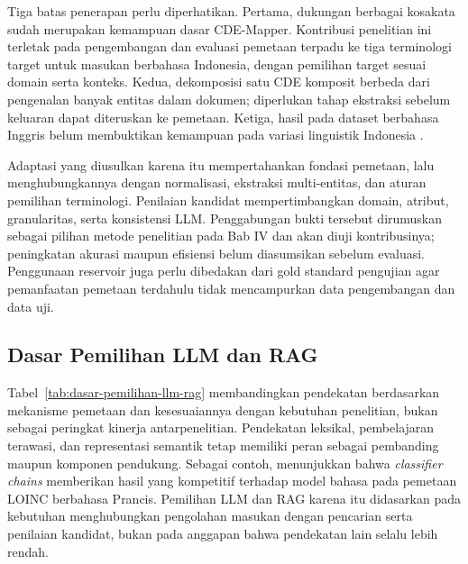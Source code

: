 Tiga batas penerapan perlu diperhatikan. Pertama, dukungan berbagai kosakata sudah merupakan kemampuan dasar CDE-Mapper. Kontribusi penelitian ini terletak pada pengembangan dan evaluasi pemetaan terpadu ke tiga terminologi target untuk masukan berbahasa Indonesia, dengan pemilihan target sesuai domain serta konteks. Kedua, dekomposisi satu CDE komposit berbeda dari pengenalan banyak entitas dalam dokumen; diperlukan tahap ekstraksi sebelum keluaran dapat diteruskan ke pemetaan. Ketiga, hasil pada dataset berbahasa Inggris belum membuktikan kemampuan pada variasi linguistik Indonesia \citep{gilani_cde-mapper_2025,purwitasari_comparison_2023}.

Adaptasi yang diusulkan karena itu mempertahankan fondasi pemetaan, lalu menghubungkannya dengan normalisasi, ekstraksi multi-entitas, dan aturan pemilihan terminologi. Penilaian kandidat mempertimbangkan domain, atribut, granularitas, serta konsistensi LLM. Penggabungan bukti tersebut dirumuskan sebagai pilihan metode penelitian pada Bab IV dan akan diuji kontribusinya; peningkatan akurasi maupun efisiensi belum diasumsikan sebelum evaluasi. Penggunaan reservoir juga perlu dibedakan dari gold standard pengujian agar pemanfaatan pemetaan terdahulu tidak mencampurkan data pengembangan dan data uji.

\subsection{Dasar Pemilihan LLM dan RAG}
\label{sec:dasar-pemilihan-llm-rag}

Tabel~\ref{tab:dasar-pemilihan-llm-rag} membandingkan pendekatan berdasarkan mekanisme pemetaan dan kesesuaiannya dengan kebutuhan penelitian, bukan sebagai peringkat kinerja antarpenelitian. Pendekatan leksikal, pembelajaran terawasi, dan representasi semantik tetap memiliki peran sebagai pembanding maupun komponen pendukung. Sebagai contoh, \citet{michel-picque_classifier_2024} menunjukkan bahwa \textit{classifier chains} memberikan hasil yang kompetitif terhadap model bahasa pada pemetaan LOINC berbahasa Prancis. Pemilihan LLM dan RAG karena itu didasarkan pada kebutuhan menghubungkan pengolahan masukan dengan pencarian serta penilaian kandidat, bukan pada anggapan bahwa pendekatan lain selalu lebih rendah.

